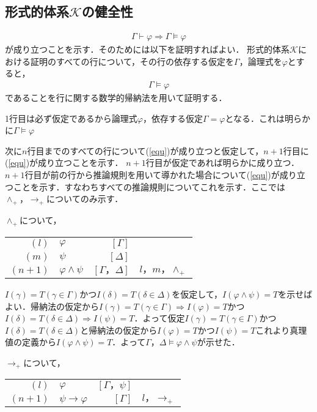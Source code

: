 \documentclass[10pt,b5paper,papersize,dvipdfmx]{jsbook}
\begin{document}
\subsection{形式的体系$\mathcal K$の健全性}
\begin{align}
\Gamma \vdash \varphi \Rightarrow \Gamma \models \varphi
\end{align}
が成り立つことを示す．そのためには以下を証明すればよい．
形式的体系$\mathcal K$における証明のすべての行について，その行の依存する仮定を$\Gamma$，論理式を$\varphi$とすると，
\begin{align}
\label{equ} \Gamma \models \varphi
\end{align}
であることを行に関する数学的帰納法を用いて証明する．\par
1行目は必ず仮定であるから論理式$\varphi$，依存する仮定$\Gamma = \varphi$となる．これは明らかに$\Gamma \models \varphi$ \par
次に$n$行目までのすべての行について(\ref{equ})が成り立つと仮定して，$n+1$行目に(\ref{equ})が成り立つことを示す．
$n+1$行目が仮定であれば明らかに成り立つ．$n+1$行目が前の行から推論規則を用いて導かれた場合について(\ref{equ})が成り立つことを示す．すなわちすべての推論規則についてこれを示す．ここでは$\land_+， \to_+$についてのみ示す．\par
$\land_+$について，
\begin{table}[H]
\begin{tabular}{rlrl}
$(l)$&$\varphi$&$[\Gamma]$& \\
$(m)$&$\psi$&$[\Delta]$& \\
$(n+1)$&$\varphi \land \psi$&$[\Gamma，\Delta]$&$l，m，\land_+$
\end{tabular}
\end{table}
$I(\gamma)=T(\gamma \in \Gamma)$かつ$I(\delta)=T(\delta \in \Delta)$を仮定して，$I(\varphi \land \psi)=T$を示せばよい．帰納法の仮定から$I(\gamma)=T(\gamma \in \Gamma)\Rightarrow I(\varphi)=T$かつ$I(\delta)=T(\delta \in \Delta)\Rightarrow I(\psi)=T$．よって仮定$I(\gamma)=T(\gamma \in \Gamma)$かつ$I(\delta)=T(\delta \in \Delta)$と帰納法の仮定から$I(\varphi)=T$かつ$I(\psi)=T$これより真理値の定義から$I(\varphi \land \psi)=T$．よって$\Gamma，\Delta \models \varphi \land \psi$が示せた．\par
$\to_+$について，
\begin{table}[H]
\begin{tabular}{rlrl}
$(l)$&$\varphi$&$[\Gamma，\psi]$& \\
$(n+1)$&$\psi \to \varphi$&$[\Gamma]$&$l，\to_+$ \\
\end{tabular}
\end{table}
\end{document}
